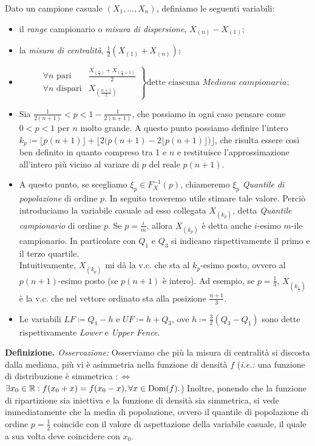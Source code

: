 \begin{dfn}
  Dato un campione casuale \((X_1,\dotsc,X_n)\), definiamo le seguenti 
  variabili:
  \begin{itemize}
    \item il \emph{range} campionario o \emph{misura di dispersione}, \(X_{(n)}-X_{(1)}\);
    \item la \emph{misura di centralità}, \(\frac12(X_{(1)}+X_{(n)})\);  

  \item 
  $$
  \left.
  \begin{array}{rl}
  \forall n \mbox{ pari} & \frac{X_{(\frac{n}{2})}+X_{(\frac{n}{2}+1)}}{2} \\
  \forall n \mbox{ dispari} & X_{(\frac{n+1}{2})}
  \end{array}
  \right\} \mbox{dette ciascuna }\textit{Mediana campionaria};
  $$
  \item Sia $\frac{1}{2(n+1)}<p<1-\frac{1}{2(n+1)}$, che possiamo in ogni caso pensare come $0<p<1$ per $n$ molto grande. A questo punto possiamo definire l'intero $k_p\coloneqq \big\lfloor p(n+1) \big\rfloor + \big\lfloor 2\big(p(n+1)- 2 \lfloor p(n+1) \rfloor \big) \big\rfloor$, che risulta essere così ben definito in quanto compreso tra 1 e $n$ e restituisce l'approssimazione all'intero più vicino al variare di $p$ del reale $p(n+1)$. 
  \item A questo punto, se scegliamo $\xi_p\in F_X^{-1}(p)$, chiameremo $\xi_p$ \textit{Quantile di popolazione} di ordine $p$. In seguito troveremo utile stimare tale valore. Perciò introduciamo la variabile casuale ad esso collegata $X_{(k_p)}$, detta \textit{Quantile campionario} di ordine $p$. Se $p=\frac{i}{m}$, allora $X_{(k_p)}$ è detta anche $i$-esimo $m$-ile campionario. In particolare con $Q_1$ e $Q_3$ si indicano rispettivamente il primo e il terzo quartile.\\
  Intuitivamente, $X_{(k_p)}$ mi dà la v.c. che sta al $k_p$-esimo posto, ovvero al $p(n+1)$-esimo posto (se $p(n+1)$ è intero). Ad esempio, se $p=\frac{1}{3}$, $X_{(k_{\frac{1}{3}})}$ è la v.c. che nel vettore ordinato sta alla posizione $\frac{n+1}{3}$.
  \item Le variabili $LF\coloneqq Q_1-h$ e $UF\coloneqq h+Q_3$, ove $h\coloneqq \frac{3}{2}(Q_3-Q_1)$ sono dette rispettivamente \textit{Lower} e \textit{Upper Fence}. 
  \end{itemize}
\end{dfn}
\textbf{Definizione.} 
\textit{Osservazione:} Osserviamo che più la misura di centralità si discosta dalla mediana, più vi è asimmetria nella funzione di densità $f$ (\textit{i.e.:} una funzione di distribuzione è simmetrica $:\Longleftrightarrow$ $\exists x_0\in \mathbb{R}:f(x_0+x)=f(x_0-x), \forall x\in \operatorname{Dom}(f).$) Inoltre, ponendo che la funzione di ripartizione sia iniettiva e la funzione di densità sia simmetrica, si vede immediatamente che la media di popolazione, ovvero il quantile di popolazione di ordine $p=\frac{1}{2}$ coincide con il valore di aspettazione della variabile casuale, il quale a sua volta deve coincidere con $x_0$. \\ \\
